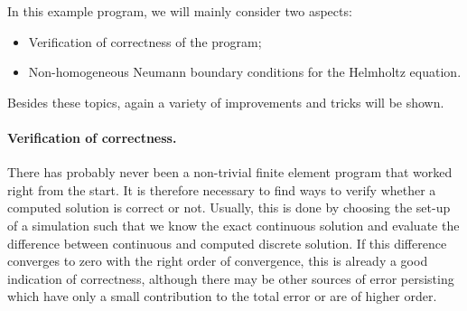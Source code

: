 \documentclass{article}
\begin{document}
In this example program, we will mainly consider two aspects:
\begin{itemize}
\item Verification of correctness of the program;
\item Non-homogeneous Neumann boundary conditions for the Helmholtz equation.
\end{itemize}
Besides these topics, again a variety of improvements and tricks will be
shown. 

\paragraph{Verification of correctness.} There has probably never been a
non-trivial finite element program that worked right from the start. It is
therefore necessary to find ways to verify whether a computed solution is
correct or not. Usually, this is done by choosing the set-up of a simulation
such that we know the exact continuous solution and evaluate the difference
between continuous and computed discrete solution. If this difference
converges to zero with the right order of convergence, this is already a good
indication of correctness, although there may be other sources of error
persisting which have only a small contribution to the total error or are of
higher order.
\end{document}
